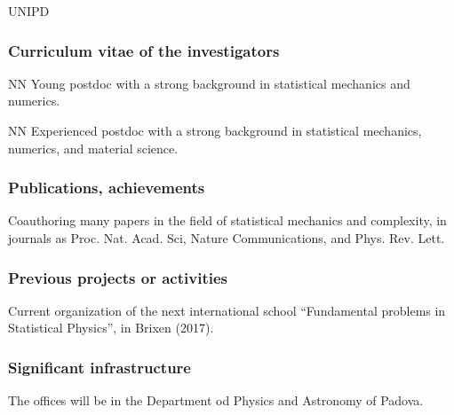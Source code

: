 \begin{sitedescription}{UNIPD}
\subsubsection*{Curriculum vitae of the investigators}




\begin{participant}[type=res,PM=36,salary=2140]{NN}
Young postdoc with a strong background in statistical mechanics and numerics.
\end{participant}

\begin{participant}[type=res,PM=36,salary=2530]{NN}
Experienced postdoc with a strong background in statistical mechanics, numerics, and material science.
\end{participant}

\subsubsection*{Publications, achievements}

\begin{compactenum}
\item Coauthoring many papers in the field of statistical mechanics and complexity, in journals as Proc. Nat. Acad. Sci, Nature Communications, and Phys. Rev. Lett.
\end{compactenum}


\subsubsection*{Previous projects or activities}

\begin{compactenum}
\item Current organization of the next international school ``Fundamental problems in Statistical
Physics'', in Brixen (2017).
\end{compactenum}

\subsubsection*{Significant infrastructure}

The offices will be in the Department od Physics and Astronomy of Padova.

\end{sitedescription}



